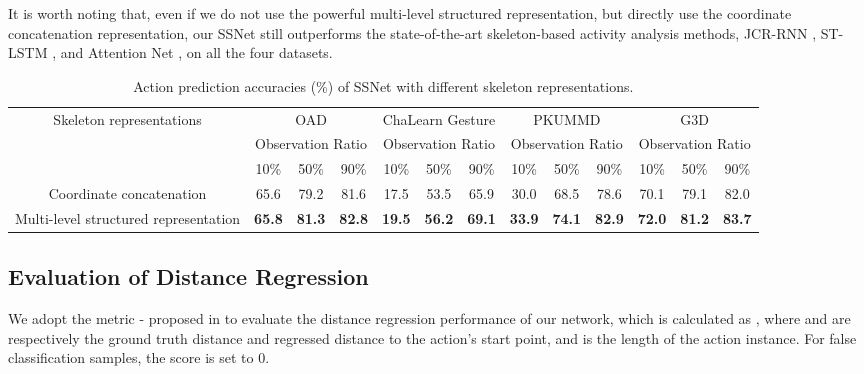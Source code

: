\documentclass[10pt,twocolumn,letterpaper]{article}
\begin{document}
It is worth noting that,
even if we do not use the powerful multi-level structured representation, but directly use the coordinate concatenation representation,
our SSNet still outperforms the state-of-the-art skeleton-based activity analysis methods,
JCR-RNN \cite{li2016online}, ST-LSTM \cite{liu2017PAMI}, and Attention Net \cite{liu2017global}, on all the four datasets.



\begin{table*}[tbp]
\caption{Action prediction accuracies (\%) of SSNet with different skeleton representations.}
\label{table:SKLrepresent}
\centering
\small
\begin{tabular}{ccccccccccccc}
\toprule
\multirow{3}{*}{Skeleton representations} & \multicolumn{3}{c}{OAD}                & \multicolumn{3}{c}{ChaLearn Gesture}    & \multicolumn{3}{c}{PKUMMD}             & \multicolumn{3}{c}{G3D} \\
\cmidrule(r){2-13}
                                          & \multicolumn{3}{c}{Observation Ratio}  & \multicolumn{3}{c}{Observation Ratio}   & \multicolumn{3}{c}{Observation Ratio}  & \multicolumn{3}{c}{Observation Ratio} \\
\cmidrule(r){2-13}

                                          &    10\% &    50\%    & 90\%            &    10\% &    50\%    & 90\%             &    10\% &    50\%    & 90\%             &    10\% &    50\%    & 90\%      \\
\midrule
Coordinate concatenation                  &  65.6   &    79.2    & 81.6            &  17.5   &   53.5     & 65.9             &   30.0  &    68.5    & 78.6             &  70.1   & 79.1       & 82.0      \\
Multi-level structured representation &\textbf{65.8}&\textbf{81.3}&\textbf{82.8} &\textbf{19.5}&\textbf{56.2}&\textbf{69.1} &\textbf{33.9}&\textbf{74.1}&\textbf{82.9} &\textbf{72.0}&\textbf{81.2}&\textbf{83.7} \\
\bottomrule
\end{tabular}
\end{table*}

\subsection{Evaluation of Distance Regression}
\label{sec:experiment:distRegression}


We adopt the metric - proposed in \cite{li2016online} to evaluate the distance regression performance of our network,
which is calculated as ,
where  and  are respectively the ground truth distance and regressed distance to the action's start point,
and  is the length of the action instance.
For false classification samples, the score is set to 0.
\end{document}
